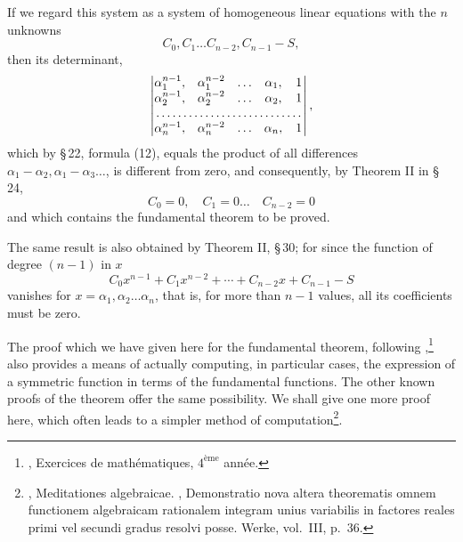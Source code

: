 If we regard this system as a system of homogeneous linear equations with the $n$ unknowns
\[
 C_0,C_1\ldots C_{n-2},C_{n-1}-S,
\]
then its determinant,
\[
\begin{vmatrix}
 \alpha_1^{n-1},&\alpha_1^{n-2}&\ldots&\alpha_1,&1\\
 \alpha_2^{n-1},&\alpha_2^{n-2}&\ldots&\alpha_2,&1\\
 \multicolumn{5}{c}{\makebox[12em]{\dotfill}}\\
 \alpha_n^{n-1},&\alpha_n^{n-2}&\ldots&\alpha_n,&1
\end{vmatrix},
\]
which by \S\,22, formula (12), equals the product of all differences $\alpha_1-\alpha_2,\alpha_1-\alpha_3\ldots$, is different from zero, and consequently, by Theorem II in \S\,24,
\[
 C_0=0,\quad C_1=0\ldots\quad C_{n-2}=0
\]
and
which contains the fundamental theorem to be proved.

The same result is also obtained by Theorem II, \S\,30; for since the function of degree $(n-1)$ in $x$
\[
 C_0x^{n-1}+C_1x^{n-2}+\cdots+C_{n-2}x+C_{n-1}-S
\]
vanishes for $x=\alpha_1,\alpha_2\ldots\alpha_n$, that is, for more than $n-1$ values, all its coefficients must be zero.

The proof which we have given here for the fundamental theorem, following ,\footnote[1]{, Exercices de mathématiques, $4^{\text{ème}}$ année.} also provides a means of actually computing, in particular cases, the expression of a symmetric function in terms of the fundamental functions. The other known proofs of the theorem offer the same possibility. We shall give one more proof here, which often leads to a simpler method of computation\footnote[2]{, Meditationes algebraicae. , Demonstratio nova altera theorematis omnem functionem algebraicam rationalem integram unius variabilis in factores reales primi vel secundi gradus resolvi posse. Werke, vol.\ III, p.\ 36.}.
